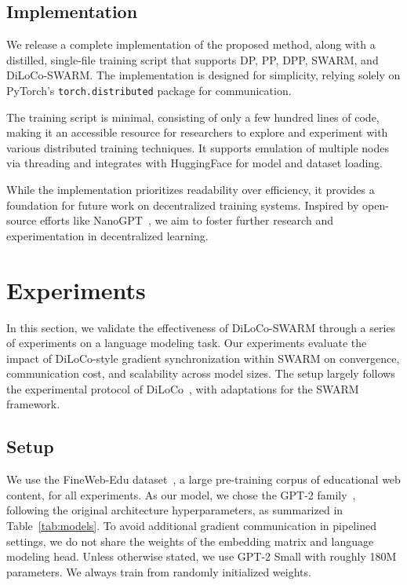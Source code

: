 \documentclass{article}
\begin{document}
\subsection{Implementation}

We release a complete implementation of the proposed method, along with a distilled, single-file training script that supports DP, PP, DPP, SWARM, and DiLoCo-SWARM. The implementation is designed for simplicity, relying solely on PyTorch's \texttt{torch.distributed} package for communication. 

The training script is minimal, consisting of only a few hundred lines of code, making it an accessible resource for researchers to explore and experiment with various distributed training techniques. It supports emulation of multiple nodes via threading and integrates with HuggingFace for model and dataset loading. 

While the implementation prioritizes readability over efficiency, it provides a foundation for future work on decentralized training systems. Inspired by open-source efforts like NanoGPT~\cite{karpathy2024nanogpt}, we aim to foster further research and experimentation in decentralized learning.

\section{Experiments}

In this section, we validate the effectiveness of DiLoCo-SWARM through a series of experiments on a language modeling task. Our experiments evaluate the impact of DiLoCo-style gradient synchronization within SWARM on convergence, communication cost, and scalability across model sizes. The setup largely follows the experimental protocol of DiLoCo~\cite{douillard2023diloco}, with adaptations for the SWARM framework.

\subsection{Setup}

We use the FineWeb-Edu dataset~\cite{penedo2024fineweb}, a large pre-training corpus of educational web content, for all experiments. As our model, we chose the GPT-2 family~\cite{radford2019gpt2}, following the original architecture hyperparameters, as summarized in Table~\ref{tab:models}. To avoid additional gradient communication in pipelined settings, we do not share the weights of the embedding matrix and language modeling head. Unless otherwise stated, we use GPT-2 Small with roughly 180M parameters. We always train from randomly initialized weights.
\end{document}
